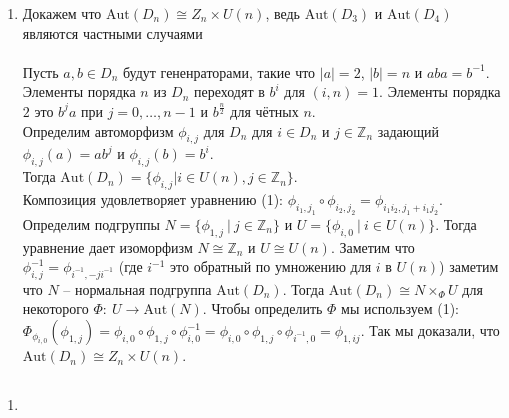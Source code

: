 \begin{enumerate}
			\item Докажем что $\text{Aut}(D_n) \cong Z_n \times U(n)$, ведь $\text{Aut}(D_3)$ и $\text{Aut}(D_4)$ являются частными случаями\\
			\\
			Пусть $a,b \in D_n$ будут гененраторами, такие что $|a| = 2$, $|b| = n$ и $aba = b^{-1}$. Элементы порядка $n$ из $D_n$ переходят в $b^i$ для $(i,n) = 1$. Элементы порядка $2$ это $b^j a$ при $j = 0, \ldots, n-1$ и $b^{\frac{n}{2}}$ для чётных $n$.\\
			Определим автоморфизм $\phi_{i, j}$ для $D_n$ для $i \in D_n$ и $j \in \mathbb{Z}_n$ задающий  $\phi_{i,j}(a) = ab^j$ и $\phi_{i,j}(b) = b^i$.\\
			Тогда $\text{Aut}(D_{n}) = \{\phi_{i, j} | i \in U(n), j \in \mathbb{Z}_{n}\}$.\\
			Композиция удовлетворяет уравнению (1): $\phi_{i_{1}, j_{1}} \circ \phi_{i_{2}, j_{2}}=\phi_{i_{1} i_{2}, j_{1}+i_{1} j_{2}}$.\\
			Определим подгруппы $N = \{ \phi_{1,j}\ |\ j \in \mathbb{Z}_n \}$ и $U = \{ \phi_{i,0}\ |\ i \in U(n) \}$. Тогда уравнение дает изоморфизм $N \cong \mathbb{Z}_n$ и $U \cong U(n)$. Заметим что $\phi_{i,j}^{-1} = \phi_{i^{-1}, -ji^{-1}}$ (где $i^{-1}$ это обратный по умножению для $i$ в $U(n)$) заметим что $N$ -- нормальная подгруппа $\text{Aut}(D_n)$. Тогда $\text{Aut}(D_n) \cong N \times_{\Phi} U$ для некоторого $\Phi:\ U \to \text{Aut}(N)$. Чтобы определить $\Phi$ мы используем (1): $\Phi_{\phi_{i, 0}}(\phi_{1, j})=\phi_{i, 0} \circ \phi_{1, j} \circ \phi_{i, 0}^{-1}=\phi_{i, 0} \circ \phi_{1, j} \circ \phi_{i^{-1}, 0}=\phi_{1, i j}$. Так мы доказали, что $\text{Aut}(D_n) \cong Z_n \times U(n)$. 
			
		\end{enumerate}
		
		\subsection{}
		\begin{enumerate}
			\item
		\end{enumerate}
		
